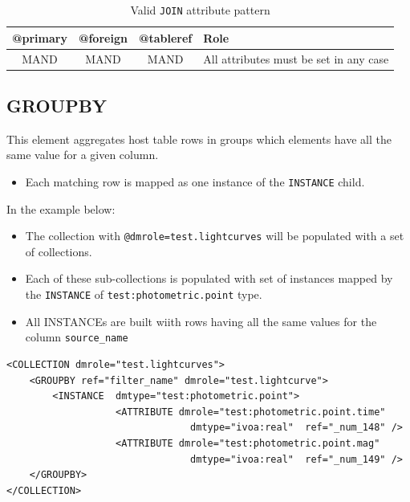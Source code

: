 \documentclass[11pt,a4paper]{ivoa}
\begin{document}
\begin{table}[!htbp]
\small
\centering
\begin{tabulary}{\linewidth}{|C|C|C|J|}
       \hline \hline
           \textbf{@primary} &  
           \textbf{@foreign} &                     
           \textbf{@tableref} &          
           \textbf{Role} \\
       \hline  
           MAND    &            
           MAND    &            
           MAND    & 
           All attributes must be set in any case \\       
       \hline 
\end{tabulary}
\caption{Valid \texttt{JOIN} attribute pattern} 
\label{tbl:join-patterns}
\end{table}


%
%
\clearpage
\subsection{GROUPBY}
This element aggregates host table rows  in groups which elements have all the same value for a given column.

\begin{itemize}
    \item Each matching row  is mapped as one instance of the \texttt{INSTANCE} child.
\end{itemize}

In the example below:

\begin{itemize}
    \item The collection with \texttt{@dmrole=test.lightcurves} will be populated with a set of collections.
    \item Each of these sub-collections is populated with set of instances mapped by the \texttt{INSTANCE} of \texttt{test:photometric.point} type.
    \item All INSTANCEs are built wiith rows having all the same values for the column \texttt{source\_name}
\end{itemize}

\begin{lstlisting}[caption={GROUPBY examples},style=XML]
<COLLECTION dmrole="test.lightcurves">
    <GROUPBY ref="filter_name" dmrole="test.lightcurve">
        <INSTANCE  dmtype="test:photometric.point">
                   <ATTRIBUTE dmrole="test:photometric.point.time" 
                                dmtype="ivoa:real"  ref="_num_148" />
                   <ATTRIBUTE dmrole="test:photometric.point.mag" 
                                dmtype="ivoa:real"  ref="_num_149" />
    </GROUPBY>
</COLLECTION>
\end{lstlisting}
\end{document}
